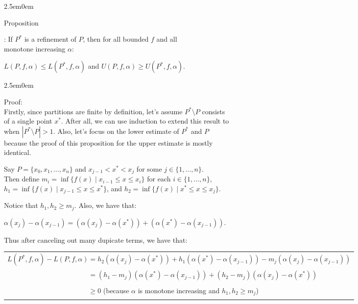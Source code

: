 \documentclass{book}
\newcommand{\hTwo}{%
   \color{MidnightBlue}%
   \fontsize{13}{15}\selectfont%
}
\newcommand{\hThree}{%
   \color{PineGreen!85!Orange}
   \fontsize{13}{15}\selectfont%
}
\newenvironment{myIndent}{%
   \begin{adjustwidth}{2.5em}{0em}%
}{%
   \end{adjustwidth}%
}
\newcounter{PropNumber}
\newcommand{\propCount}[1][1]{%
   \addtocounter{PropNumber}{#1}%
   \thePropNumber%
}
\newcommand{\retTwo}{\hfill\bigbreak}
\begin{document}
{\begin{myIndent}\hTwo
   Proposition \propCount: If $P^*$ is a refinement of $P$, then for all bounded $f$ and all\\ monotone increasing $\alpha$: 
   
   {\centering$L(P, f, \alpha) \leq L(P^*, f, \alpha)$ and $U(P, f, \alpha) \geq U(P^*, f, \alpha)$.\retTwo\par}

   {\begin{myIndent}\hThree
      Proof:\\
      Firstly, since partitions are finite by definition, let's assume $P^* \setminus P$ consists\\ of a single point $x^*$. After all, we can use induction to extend this result to\\ when $|P^* \setminus P| > 1$. Also, let's focus on the lower estimate of $P^*$ and $P$\\ because the proof of this proposition for the upper estimate is mostly\\ identical.\retTwo

      Say $P = \{x_0, x_1, \ldots, x_n\}$ and $x_{j-1} < x^* < x_j$ for some $j \in \{1,\ldots, n\}$.\\ Then define $m_i = \inf\{f(x) \mid x_{i-1} \leq x \leq x_i\}$ for each $i \in \{1, \ldots, n\}$,\\ $h_1 = \inf\{f(x) \mid x_{j-1} \leq x \leq x^*\}$, and $h_2 = \inf\{f(x) \mid x^* \leq x \leq x_j\}$.\retTwo

      Notice that $h_1, h_2 \geq m_j$. Also, we have that:
      
      {\centering$\alpha(x_j) - \alpha(x_{j-1}) = (\alpha(x_j) - \alpha(x^*)) + (\alpha(x^*) - \alpha(x_{j-1}))$.\retTwo\par}

      Thus after canceling out many dupicate terms, we have that:
      \end{myIndent}}\end{myIndent}}
      {\begin{center}\hThree\fontsize{11}{13}\selectfont
         \begin{tabular}{l}
            $L(P^*, f, \alpha) - L(P, f, \alpha) = h_2(\alpha(x_j) - \alpha(x^*)) + h_1(\alpha(x^*) - \alpha(x_{j-1})) - m_j(\alpha(x_j) - \alpha(x_{j-1}))$\\ [3pt]
            $\phantom{L(P^*, f, \alpha) - L(P, f, \alpha)} = (h_1 - m_j)(\alpha(x^*) - \alpha(x_{j-1})) + (h_2 - m_j)(\alpha(x_j) - \alpha(x^*))$\\ [3pt]
            $\phantom{L(P^*, f, \alpha) - L(P, f, \alpha)} \geq 0$ (because $\alpha$ is monotone increasing and $h_1, h_2 \geq m_j$)
         \end{tabular}
      \end{center}}
\end{document}
